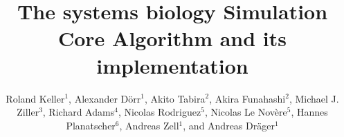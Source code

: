 \documentclass[10pt]{bmc_article}
\newenvironment{bmcformat}{\baselineskip20pt\sloppy\setboolean{publ}{false}}{\baselineskip20pt\sloppy}
\begin{document}
\begin{bmcformat}



\title{The systems biology Simulation Core Algorithm and its implementation}



\author{%
Roland Keller$^{1}$, %
Alexander D\"orr$^{1}$, %
Akito Tabira$^{2}$, %
Akira Funahashi$^{2}$, %
Michael J. Ziller$^{3}$, %
Richard Adams$^{4}$, %
Nicolas Rodriguez$^{5}$, %
Nicolas Le Nov\`{e}re$^{5}$, %
Hannes Planatscher$^{6}$, %
Andreas Zell$^{1}$, %
and Andreas Dr\"ager$^{1}$\correspondingauthor{}%
}


\address{%
\iid(1)Center for Bioinformatics Tuebingen (ZBIT), University of
Tuebingen, T\"ubingen, Germany
\iid(2)Keio University, Graduate School of
Science and Technology, Yokohama, Japan 
\iid(3)Department of Stem Cell and Regenerative Biology, Harvard University,
Cambridge, MA, USA
\iid(4)SynthSys Edinburgh, CH Waddington Building, University of Edinburgh,
Edinburgh EH9 3JD, UK
\iid(5)European Bioinformatics Institute, Wellcome Trust Genome Campus, Hinxton,
Cambridge, UK
\iid(6)Natural and Medical Sciences Institute at the University of Tuebingen,
Reutlingen, Germany}


\end{bmcformat}
\end{document}
